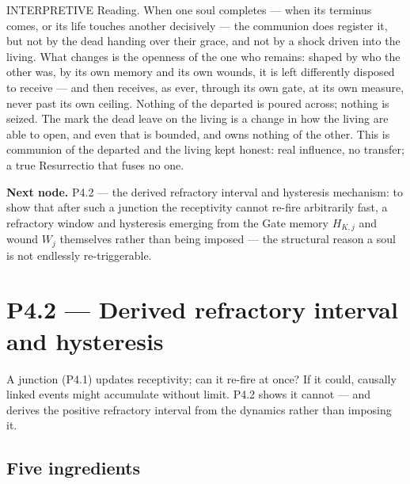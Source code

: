 \documentclass[11pt,a4paper]{article}
\def\emph#1{#1}%
\newcommand{\stInterp}{\textcolor{cInt}{\textsf{\small INTERPRETIVE}}}
\theoremstyle{definition}
\theoremstyle{plain}
\theoremstyle{remark}
\begin{document}
\medskip
\stInterp\quad
\emph{Reading.}
When one soul completes --- when its terminus comes, or its life touches another decisively
--- the communion does register it, but not by the dead handing over their grace, and not by a
shock driven into the living. What changes is the openness of the one who remains: shaped by
who the other was, by its own memory and its own wounds, it is left differently disposed to
receive --- and then receives, as ever, through its own gate, at its own measure, never past
its own ceiling. Nothing of the departed is poured across; nothing is seized. The mark the
dead leave on the living is a change in how the living are able to open, and even that is
bounded, and owns nothing of the other. This is communion of the departed and the living
kept honest: real influence, no transfer; a true Resurrectio that fuses no one.

\medskip
\textbf{Next node.} P4.2 --- the derived refractory interval and hysteresis mechanism: to
show that after such a junction the receptivity cannot re-fire arbitrarily fast, a refractory
window and hysteresis emerging from the Gate memory \(H_{K,j}\) and wound \(W_j\) themselves
rather than being imposed --- the structural reason a soul is not endlessly re-triggerable.

\section{P4.2 --- Derived refractory interval and hysteresis}

A junction (P4.1) updates receptivity; can it re-fire at once? If it could, causally linked
events might accumulate without limit. P4.2 shows it cannot --- and derives the positive
refractory interval from the dynamics rather than imposing it.

\subsection{Five ingredients}
\end{document}

